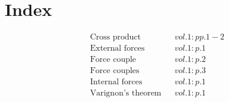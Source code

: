 \documentclass[a4paper]{article}
\begin{document}
 
\section*{Index} 
\begin{align*} 
&\text{Cross product}&& vol. 1: pp. 1-2\\
&\text{External forces}&& vol. 1: p. 1\\
&\text{Force couple}&& vol. 1: p. 2\\
&\text{Force couples}&& vol. 1: p. 3\\
&\text{Internal forces}&& vol. 1: p. 1\\
&\text{Varignon's theorem}&& vol. 1: p. 1\\
\end{align*} 
\end{document}
